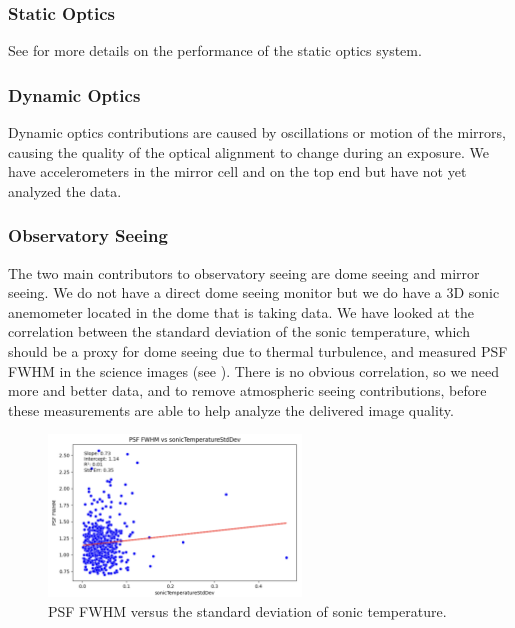 \subsubsection{Static Optics}

See  for more details on the performance of the static optics system.

\subsubsection{Dynamic Optics}

Dynamic optics contributions are caused by oscillations or motion of the mirrors, causing the quality of the
optical alignment to change during an exposure. We have accelerometers in the mirror cell and on the top end
but have not yet analyzed the data.

\subsubsection{Observatory Seeing}

The two main contributors to observatory seeing are dome seeing and mirror seeing. We do not have a direct
dome seeing monitor but we do have a 3D sonic anemometer located in the dome that is taking data. We have
looked at the correlation between the standard deviation of the sonic temperature, which should be a proxy for
dome seeing due to thermal turbulence, and measured PSF FWHM in the science images (see
). There is no obvious correlation, so we need more and better data, and to remove
atmospheric seeing contributions, before these measurements are able to help analyze the delivered image
quality.

\begin{figure}
  \begin{center}
    \includegraphics[width=0.6\textwidth]{image_quality_figures/anemometer_PSF.png}
  \end{center}
  \caption{PSF FWHM versus the standard deviation of sonic temperature.}
  \label{fig:anemometer}
\end{figure}

